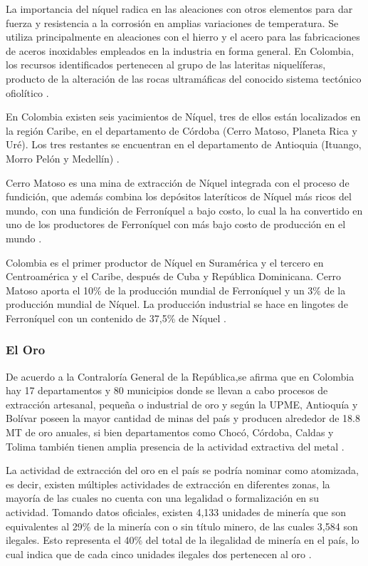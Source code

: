 La importancia del níquel radica en las aleaciones con otros elementos para dar fuerza y resistencia a la corrosión en amplias variaciones de temperatura. Se utiliza principalmente en aleaciones con el hierro y el acero para las fabricaciones de aceros inoxidables empleados en la industria en forma general. En Colombia, los recursos identificados pertenecen al grupo de las lateritas niquelíferas, producto de la alteración de las rocas ultramáficas del conocido sistema tectónico ofiolítico \cite{cardenas}.

En Colombia existen seis yacimientos de Níquel, tres de ellos están localizados en la región Caribe, en el departamento de Córdoba (Cerro Matoso, Planeta Rica  y Uré). Los tres restantes se encuentran en el departamento de Antioquia (Ituango, Morro Pelón y Medellín) \cite{niquelMain}.

Cerro Matoso es una mina de extracción de Níquel integrada con el proceso de  fundición, que además combina los depósitos lateríticos de Níquel más ricos del mundo, con una fundición de Ferroníquel a bajo costo, lo cual la ha convertido en uno de los productores de Ferroníquel con más bajo costo de producción en el mundo \cite{niquelMain}.

Colombia es el primer productor de Níquel en Suramérica y el tercero en Centroamérica y el Caribe, después de Cuba y República Dominicana. Cerro Matoso aporta el 10\% de la producción mundial de Ferroníquel y un 3\% de la producción mundial de Níquel. La producción industrial se hace en lingotes de Ferroníquel con un contenido de 37,5\% de Níquel \cite{niquelMain}.

\subsubsection{El Oro}
De acuerdo a la Contraloría General de la República,se afirma que en Colombia hay 17 departamentos y 80 municipios donde se llevan a cabo procesos de extracción artesanal, pequeña o industrial de oro y según la UPME, Antioquía y   Bolívar poseen la mayor cantidad de minas del país y producen alrededor de  18.8  MT de oro anuales, si bien departamentos como Chocó, Córdoba, Caldas y Tolima  también tienen amplia presencia de la actividad extractiva del metal \cite{oroMain}.

La actividad de extracción del oro en el país se podría nominar como atomizada, es decir, existen múltiples actividades de extracción en diferentes zonas, la mayoría de las cuales no cuenta con una legalidad o formalización en su actividad. Tomando datos oficiales, existen 4,133 unidades de minería que son  equivalentes al 29\% de la minería con o sin título minero, de las cuales 3,584 son ilegales. Esto representa el 40\% del total de la ilegalidad de minería en el país, lo cual indica que de cada cinco unidades ilegales dos pertenecen al oro \cite{oroMain}.

